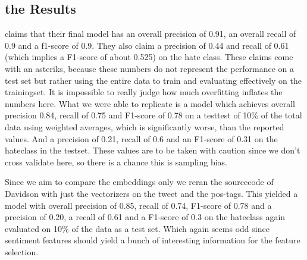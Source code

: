 \documentclass[11pt,a4paper]{article}
\begin{document}
\subsection{the Results}
\cite{auto_hatespeech} claims that their final model has an overall precision of 0.91, an overall recall of 0.9 and a f1-score of 0.9.
They also claim a precision of 0.44 and recall of 0.61 (which implies a F1-score of about 0.525) on the hate class.
These claims come with an asteriks, because these numbers do not represent the performance on a test set but rather using the entire
data to train and evaluating effectively on the trainingset. 
It is impossible to really judge how much overfitting inflates the numbers here.
What we were able to replicate is a model which achieves overall precision 0.84, recall of 0.75 and F1-score of 0.78 on a testtest of 10\% of the total data
using weighted averages, which is significantly worse, than the reported values.
And a precision of 0.21, recall of 0.6 and an F1-score of 0.31 on the hateclass in the testset.
These values are to be taken with caution since we don't cross validate here, so there is a chance this is sampling bias. 

\begin{table}
\caption{classification report for our reporduction of Davidsons model with features}

\label{tab:davidson_withfeat}
\end{table}

Since we aim to compare the embeddings only we reran the sourcecode of Davidson with just the vectorizers on the tweet and the pos-tags.
This yielded a model with overall precision of 0.85, recall of 0.74, F1-score of 0.78
and a precision of 0.20, a recall of 0.61 and a F1-score of 0.3 on the hateclass again evaluated on 10\% of the data as a test set.
Which again seems odd since sentiment features should yield a bunch of interesting information for the feature selection.
\end{document}
